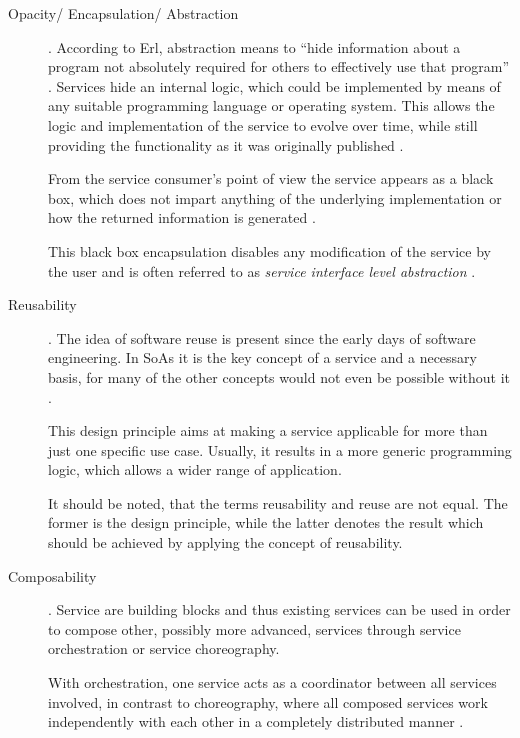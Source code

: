 \begin{description}
\item [Opacity/ Encapsulation/ Abstraction] .
According to Erl, abstraction means to ``hide information about a program not absolutely required for others to effectively use that program'' \cite[ch.8.1.]{erl2008}.
Services hide an internal logic, which could be implemented by means of any suitable programming language or operating system. This allows the logic and implementation of the service to evolve over time, while still providing the functionality as it was originally published \cite[ch.8.1]{erl2008}.

From the service consumer's point of view the service appears as a black box, which does not impart anything of the underlying implementation or how the returned information is generated \cite{opengroup} \cite{breivold} \cite{arrowhead} \cite[p.27]{erl2011}.

This black box encapsulation disables any modification of the service by the user and is often referred to as \emph{service interface level abstraction} \cite{breivold}.

\item [Reusability].
The idea of software reuse is present since the early days of software engineering. In SoAs it is the key concept of a service and a necessary basis, for many of the other concepts would not even be possible without it \cite[ch.9.1.]{erl2008} \cite[p.27]{erl2011}.

This design principle aims at making a service applicable for more than just one specific use case. Usually, it results in a more generic programming logic, which allows a wider range of application.

It should be noted, that the terms reusability and reuse are not equal. The former is the design principle, while the latter denotes the result which should be achieved by applying the concept of reusability.

\item [Composability]. 
Service are building blocks and thus existing services can be used in order to compose other, possibly more advanced, services through service orchestration or service choreography. 

With orchestration, one service acts as a coordinator between all services involved, in contrast to choreography, where all composed services work independently with each other in a completely distributed manner \cite{opengroup} \cite{arrowhead} \cite{breivold} \cite[p.27]{erl2011}.


\end{description}
